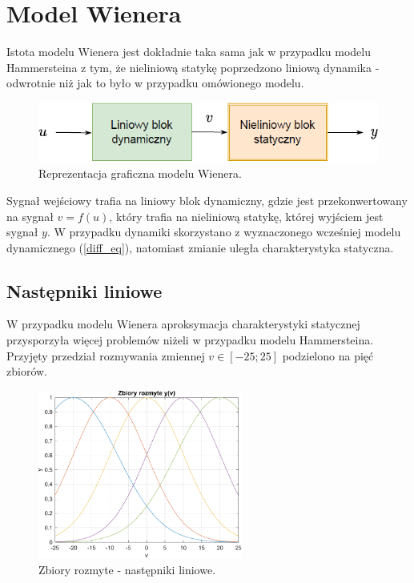 \chapter{Model Wienera}
Istota modelu Wienera jest dokładnie taka sama jak w przypadku modelu Hammersteina z tym, że nieliniową statykę poprzedzono liniową dynamika - odwrotnie niż jak to było w przypadku omówionego modelu.

\begin{figure}[h!]
\centering
\includegraphics[width=\textwidth]{pictures/wien_model}
\caption{Reprezentacja graficzna modelu Wienera.}
\end{figure}

Sygnał wejściowy trafia na liniowy blok dynamiczny, gdzie jest przekonwertowany na sygnał $v = f(u)$, który trafia na nieliniową statykę, której wyjściem jest sygnał $y$. W przypadku dynamiki skorzystano z wyznaczonego wcześniej modelu dynamicznego (\ref{diff_eq}), natomiast zmianie uległa charakterystyka statyczna.

\section{Następniki liniowe}
W przypadku modelu Wienera aproksymacja charakterystyki statycznej przysporzyła więcej problemów niżeli w przypadku modelu Hammersteina. Przyjęty przedział rozmywania zmiennej $v \in [-25;25]$ podzielono na pięć zbiorów.

\begin{figure}[h!]
\centering
\includegraphics[width=0.6\textwidth]{pictures/fuzzy_set_wien}
\caption{Zbiory rozmyte - następniki liniowe.}
\end{figure}

